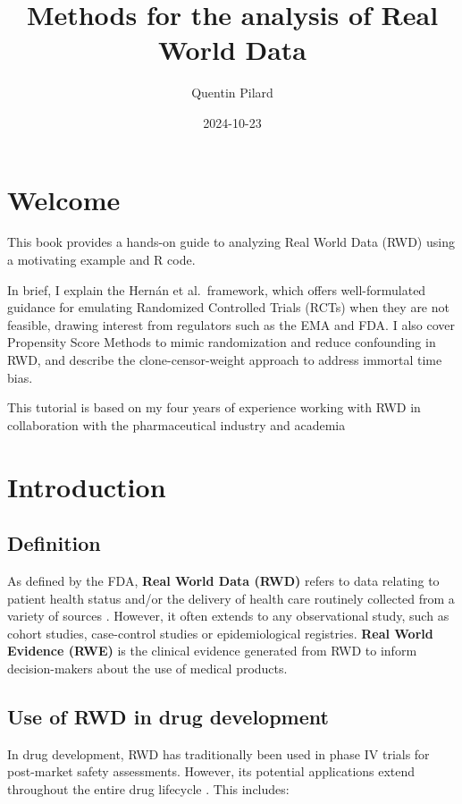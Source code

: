 \documentclass[
]{book}
\title{Methods for the analysis of Real World Data}
\author{Quentin Pilard}
\date{2024-10-23}
\begin{document}
\maketitle

{
\setcounter{tocdepth}{1}
\tableofcontents
}
\chapter{Welcome}\label{welcome}

This book provides a hands-on guide to analyzing Real World Data (RWD) using a motivating example and R code.

In brief, I explain the Hernán et al.~framework, which offers well-formulated guidance for emulating Randomized Controlled Trials (RCTs) when they are not feasible, drawing interest from regulators such as the EMA and FDA. I also cover Propensity Score Methods to mimic randomization and reduce confounding in RWD, and describe the clone-censor-weight approach to address immortal time bias.

This tutorial is based on my four years of experience working with RWD in collaboration with the pharmaceutical industry and academia

\chapter{Introduction}\label{introduction}

\section{Definition}\label{definition}

As defined by the FDA, \textbf{Real World Data (RWD)} refers to data relating to patient health status and/or the delivery of health care routinely collected from a variety of sources \citep{commissioner_real-world_2024}. However, it often extends to any observational study, such as cohort studies, case-control studies or epidemiological registries. \textbf{Real World Evidence (RWE)} is the clinical evidence generated from RWD to inform decision-makers about the use of medical products.

\section{Use of RWD in drug development}\label{use-of-rwd-in-drug-development}

In drug development, RWD has traditionally been used in phase IV trials for post-market safety assessments. However, its potential applications extend throughout the entire drug lifecycle \citep{khosla_real_2018}. This includes:
\end{document}
